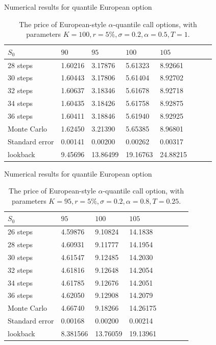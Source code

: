 \documentclass[cjk,10pt]{beamer}
\begin{document}
\begin{frame}{Numerical results for quantile European option}
\begin{table}
\caption{The price of European-style $\alpha$-quantile call options, with parameters
	$K=100, r=5\%, \sigma=0.2, \alpha=0.5, T=1$. }
\begin{center}
\begin{tabular}{l|lllllll}
 $S_0$ & $90$ & $95$ & $100$ & $105$ \\
\hline
28 steps & 1.60216 & 3.17876 & 5.61323 & 8.92661\\
30 steps & 1.60443 & 3.17806 & 5.61404 & 8.92702\\
32 steps & 1.60637 & 3.18346 & 5.61678 & 8.92718\\ 
34 steps & 1.60435 & 3.18426 & 5.61758 & 8.92875\\
36 steps & 1.60411 & 3.18846 & 5.61940 & 8.92925\\
\hline
Monte Carlo & 1.62450 & 3.21390 &  5.65385 & 8.96801 \\
Standard error & 0.00141 & 0.00200 & 0.00262 & 0.00317 \\
\hline
lookback & 9.45696 & 13.86499 & 19.16763 & 24.88215
\end{tabular}
\end{center}
\label{fig:euro5}
\end{table}%
\end{frame}

\begin{frame}{Numerical results for quantile European option}
\begin{table}
\caption{The price of European-style $\alpha$-quantile call option,
	with parameters
	$K=95, r=5\%, \sigma=0.2, \alpha=0.8, T=0.25$. }
\begin{center}
\begin{tabular}{l|lllllll}
$S_0$ & $95$ & $100$ & $105$        \\
\hline
26 steps & 4.59876 & 9.10824 & 14.1838 \\
28 steps & 4.60931 & 9.11777 & 14.1954 \\
30 steps & 4.61547 & 9.12485 & 14.2030 \\
32 steps & 4.61816 & 9.12648 & 14.2054 \\
34 steps & 4.61785 & 9.12676 & 14.2051 \\
36 steps & 4.62050 & 9.12908 & 14.2079 \\
\hline
Monte Carlo & 4.66740 & 9.18266 & 14.26175\\
Standard error & 0.00168 & 0.00200 &  0.00214\\
\hline
lookback & 8.381566 &  13.76059 & 19.13961
\end{tabular}
\end{center}
\label{fig:euro8}
\end{table}%
\end{frame}
\end{document}
